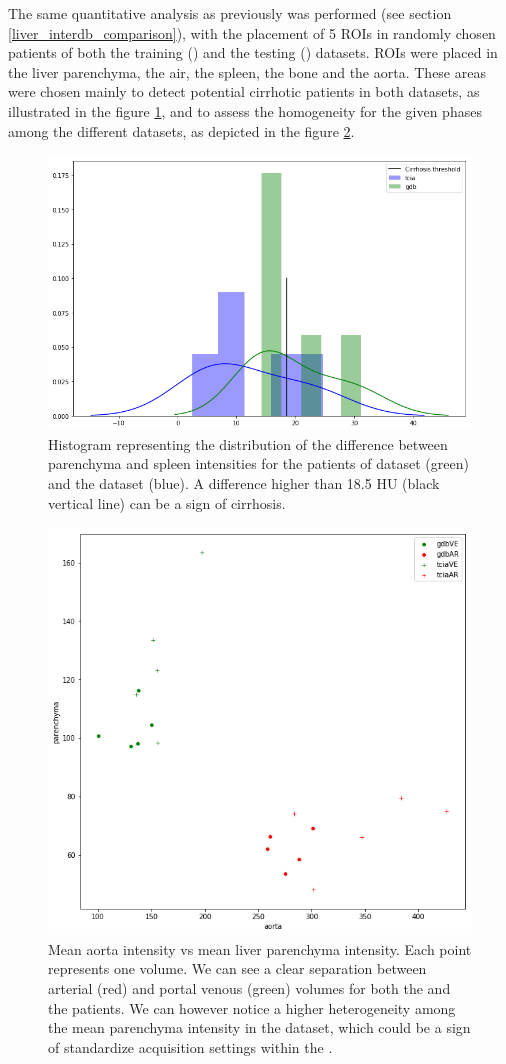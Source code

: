 The same quantitative analysis as previously was performed (see section \ref{liver_interdb_comparison}), with the placement of 5 ROIs in randomly chosen patients of both the training (\textbf{}) and the testing (\textbf{}) datasets. ROIs were placed in the liver parenchyma, the air, the spleen, the bone and the aorta. These areas were chosen mainly to detect potential cirrhotic patients in both datasets, as illustrated in the figure \ref{fig:cirrhoticPatPlot}, and to assess the homogeneity for the given phases among the different datasets, as depicted in the figure \ref{fig:gdbAortaPlot}. 
\begin{figure}[!ht]
	\centering
	\includegraphics[width=0.6\linewidth]{../Contributions/images/Gdb_TCIA_cirrhosisPlot_bins5}
	\caption{Histogram representing the distribution of the difference between parenchyma and spleen intensities for the patients of  \textbf{} dataset (green) and the  \textbf{} dataset (blue). A difference higher than 18.5 HU (black vertical line) can be a sign of cirrhosis.
	}
	\label{fig:cirrhoticPatPlot}
\end{figure}
\begin{figure}[!ht]
	\centering
	\includegraphics[width=0.6\linewidth]{../Contributions/images/AortaParPlot_Gdb_2}
	\caption{Mean aorta intensity vs mean liver parenchyma intensity. Each point represents one volume. We can see a clear separation between arterial (red) and portal venous (green) volumes for both the \textbf{} and the \textbf{} patients. We can however notice a higher heterogeneity among the mean parenchyma intensity in the \textbf{} dataset, which could be a sign of standardize acquisition settings within the \textbf{}.
	}
	\label{fig:gdbAortaPlot}
\end{figure}


